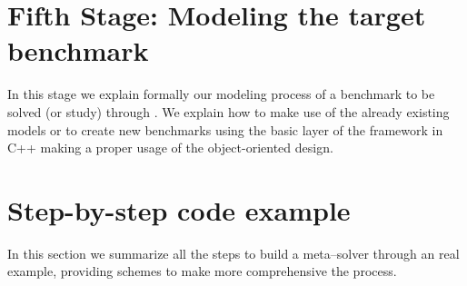 



\section{Fifth Stage: Modeling the target benchmark}

In this stage we explain formally our modeling process of a benchmark to be solved (or study) through \posl{}. We explain how to make use of the already existing models or to create new benchmarks using the basic layer of the framework in C++ making a proper usage of the object-oriented design.

\section{Step-by-step \posl{} code example}

In this section we summarize all the steps to build a \posl{} meta--solver through an real example, providing schemes to make more comprehensive the process.
